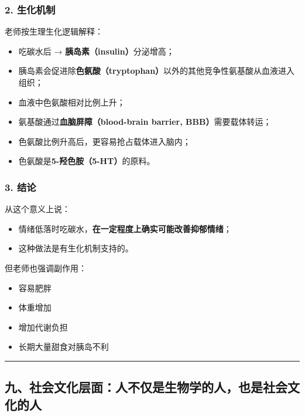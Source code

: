\documentclass[
  chinese,
  9pt,
  a4paper,
]{ctexart}
\providecommand{\tightlist}{%
  \setlength{\itemsep}{0pt}\setlength{\parskip}{0pt}}
\begin{document}
\subsubsection{2. 生化机制}\label{ux751fux5316ux673aux5236}

老师按生理生化逻辑解释：

\begin{itemize}
\tightlist
\item
  吃碳水后 → \textbf{胰岛素（insulin）}分泌增高；
\item
  胰岛素会促进除\textbf{色氨酸（tryptophan）}以外的其他竞争性氨基酸从血液进入组织；
\item
  血液中色氨酸相对比例上升；
\item
  氨基酸通过\textbf{血脑屏障（blood-brain barrier, BBB）}需要载体转运；
\item
  色氨酸比例升高后，更容易抢占载体进入脑内；
\item
  色氨酸是\textbf{5-羟色胺（5-HT）}的原料。
\end{itemize}

\subsubsection{3. 结论}\label{ux7ed3ux8bba}

从这个意义上说：

\begin{itemize}
\tightlist
\item
  情绪低落时吃碳水，\textbf{在一定程度上确实可能改善抑郁情绪}；
\item
  这种做法是有生化机制支持的。
\end{itemize}

但老师也强调副作用：

\begin{itemize}
\tightlist
\item
  容易肥胖
\item
  体重增加
\item
  增加代谢负担
\item
  长期大量甜食对胰岛不利
\end{itemize}

\begin{center}\rule{0.5\linewidth}{0.5pt}\end{center}

\subsection{九、社会文化层面：人不仅是生物学的人，也是社会文化的人}\label{ux4e5dux793eux4f1aux6587ux5316ux5c42ux9762ux4ebaux4e0dux4ec5ux662fux751fux7269ux5b66ux7684ux4ebaux4e5fux662fux793eux4f1aux6587ux5316ux7684ux4eba}
\end{document}
